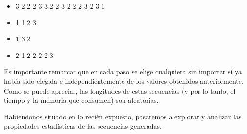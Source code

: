 \documentclass{article}
\begin{document}
\begin{itemize}
\itemsep=2pt \topsep=0pt \partopsep=0pt \parskip=0pt \parsep=0pt
	\item 3 2 2 2 3 3 2 2 3 2 2 2 3 2 3 1
	\item 1 1 2 3
	\item 1 3 2
	\item 2 1 2 2 2 2 3
\end{itemize}

	Es importante remarcar que en cada paso se elige cualquiera sin importar si ya había sido elegida e independientemente de los valores obtenidos anteriormente. Como se puede apreciar, las longitudes de estas secuencias (y por lo tanto, el tiempo y la memoria que consumen) son aleatorias.
	\par 
	Habiendonos situado en lo recién expuesto, pasaremos a explorar y analizar las propiedades estadísticas de las secuencias generadas.
\end{document}
